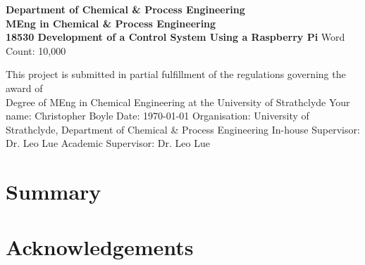 \documentclass{report}
\def\atitle{Development of a Control System Using a Raspberry Pi}
\begin{document}
	\begin{titlepage}
		\centering
		\vskip4cm
		{
			\bfseries\Large
			Department of Chemical \& Process Engineering\\
			\vskip1cm
			MEng in Chemical \& Process Engineering\\
			18530
			\vskip3cm
			\LARGE\atitle
		}
		\vskip3cm
		{\small Word Count: 10,000}
		\vskip1cm
		\begin{flushleft}
			This project is submitted in partial fulfillment of the regulations governing the award of \\
			Degree of MEng in Chemical Engineering at the University of Strathclyde
			\vskip2cm
			Your name: Christopher Boyle \hfill Date: \today
			\vskip1cm
			Organisation: University of Strathclyde, Department of Chemical \& Process Engineering\newline%
			In-house Supervisor: Dr. Leo Lue \newline%
			Academic Supervisor: Dr. Leo Lue
		\end{flushleft}
	\end{titlepage}

	
	\chapter*{Summary}
	
	\tableofcontents
	
	\chapter*{Acknowledgements}
	
\end{document}
